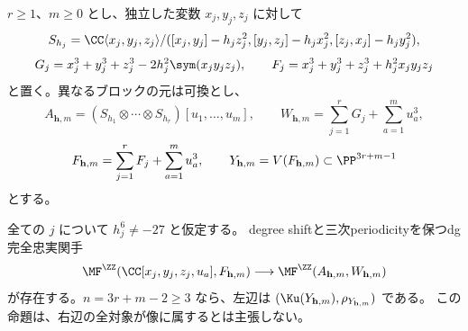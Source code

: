 \(r\ge1\)、\(m\ge0\) とし、独立した変数 \(x_j,y_j,z_j\) に対して
\[
 S_{h_j}=\CC\langle x_j,y_j,z_j\rangle/
 ([x_j,y_j]-h_jz_j^2,[y_j,z_j]-h_jx_j^2,[z_j,x_j]-h_jy_j^2),
\]
\[
 G_j=x_j^3+y_j^3+z_j^3-2h_j^2\sym(x_jy_jz_j),\qquad
 F_j=x_j^3+y_j^3+z_j^3+h_j^2x_jy_jz_j
\]
と置く。異なるブロックの元は可換とし、
\[
 A_{\mathbf h,m}=(S_{h_1}\otimes\cdots\otimes S_{h_r})[u_1,\ldots,u_m],
 \qquad W_{\mathbf h,m}=\sum_{j=1}^rG_j+\sum_{a=1}^m u_a^3,
\]
\[
 F_{\mathbf h,m}=\sum_{j=1}^rF_j+\sum_{a=1}^m u_a^3,
 \qquad Y_{\mathbf h,m}=V(F_{\mathbf h,m})\subset\PP^{3r+m-1}
\]
とする。

\begin{proposition}[多ブロックの完全忠実比較]\label{prop:multiblock-embedding}
 全ての \(j\) について \(h_j^6\ne-27\) と仮定する。
 degree shiftと三次periodicityを保つdg完全忠実関手
 \[
 \MF^{\ZZ}(\CC[x_j,y_j,z_j,u_a],F_{\mathbf h,m})
 \longrightarrow
 \MF^{\ZZ}(A_{\mathbf h,m},W_{\mathbf h,m})
 \]
 が存在する。\(n=3r+m-2\ge3\) なら、左辺は
 \((\Ku(Y_{\mathbf h,m}),\rho_{Y_{\mathbf h,m}})\) である。
 この命題は、右辺の全対象が像に属するとは主張しない。
\end{proposition}
